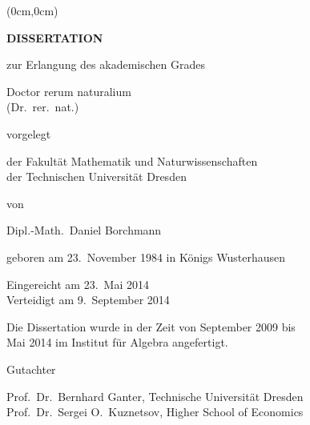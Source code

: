 {
  \makeatletter
  \def\thetitle{\@title}
  \makeatother

  \begin{textblock*}{\paperwidth}(0cm,0cm)
    \vspace*{4\baselineskip}
    \parbox[b][0.8\paperheight]{\paperwidth}{
      \centering

      \vfill{}

      \Huge

      \textbf{\thetitle}

      \vfill{}

      \LARGE
      \textbf{D\;I\;S\;S\;E\;R\;T\;A\;T\;I\;O\;N}

      \vspace*{2ex}
      zur Erlangung des akademischen Grades
      \vspace*{2ex}

      Doctor rerum naturalium \\
      (Dr.\ rer.\ nat.)

      \vfill

      {\Large vorgelegt}

      \vfill

      der Fakultät Mathematik und Naturwissenschaften\\
      der Technischen Universität Dresden

      \vfill

      {\Large von}

      \vfill

      {\Large
        Dipl.-Math.\ Daniel Borchmann

        \large
        geboren am 23.\ November 1984 in Königs Wusterhausen
      }

      \vfill

      Eingereicht am 23.\ Mai 2014\\
      Verteidigt am 9.\ September 2014

      \vfill

      \large

      Die Dissertation wurde in der Zeit von September 2009 bis\\
      Mai 2014 im Institut für Algebra angefertigt.

      \vfill

      \Large

      Gutachter

      \smallskip

      \large

      Prof.\ Dr.\ Bernhard Ganter, Technische Universität Dresden\\
      Prof.\ Dr.\ Sergei O.\ Kuznetsov, Higher School of Economics

      \vfill

    }
  \end{textblock*}

}

